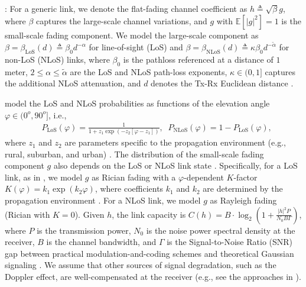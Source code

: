 \documentclass[12pt, draftcls, onecolumn]{IEEEtran}
\theoremstyle{plain}
\theoremstyle{definition}
\theoremstyle{remark}
\begin{document}
: For a generic link, we denote the flat-fading channel coefficient as $h{\triangleq}\sqrt{\beta}g$, where $\beta$ captures the large-scale channel variations, and $g$ with $\mathbb{E}\left[|g|^2\right]{=}1$ is the small-scale fading component. We model the large-scale component as $\beta{=}\beta_{\mathrm{LoS}}(d){\triangleq}\beta_{0}d^{-\alpha}$ for line-of-sight (LoS) and $\beta{=}\beta_{\mathrm{NLoS}}(d){\triangleq}\kappa\beta_{0}d^{-\tilde{\alpha}}$ for non-LoS (NLoS) links, where $\beta_{0}$ is the pathloss referenced at a distance of $1$ meter, $2{\leq}\alpha{\leq}\tilde{\alpha}$ are the LoS and NLoS path-loss exponents, $\kappa{\in}(0,1]$ captures the additional NLoS attenuation, and $d$ denotes the Tx-Rx Euclidean distance \cite{SCA}.

 model the LoS and NLoS probabilities as functions of the elevation angle $\varphi{\in}(0^{o},90^{o}]$, i.e., 
\begin{align}\label{eq:PLoS}
	&P_{\mathrm{LoS}}(\varphi)=\frac{1}{1+z_{1}\exp\left(-z_{2}\left[\varphi-z_{1}\right]\right)},\;\;
	P_{\mathrm{NLoS}}(\varphi)=1-P_{\mathrm{LoS}}(\varphi),
\end{align}
where $z_{1}$ and $z_{2}$ are parameters specific to the propagation environment (e.g., rural, suburban, and urban) \cite{LAP}. The distribution of the small-scale fading component $g$ also depends on the LoS or NLoS link state \cite{WCBook}. Specifically, for a LoS link, as in \cite{Rician}, we model $g$ as Rician fading with a $\varphi$-dependent $K$-factor $K(\varphi){=}k_{1}\exp\left(k_{2}\varphi\right)$, where coefficients $k_{1}$ and $k_{2}$ are determined by the propagation environment \cite{Rician}. For a NLoS link, we model $g$ as Rayleigh fading \cite{WCBook} (Rician with $K{=}0$). Given $h$, the link capacity is $C(h){=}B{\cdot}\log_{2}\left(1{+}\frac{|h|^{2}P}{N_{0}B\Gamma} \right)$, where $P$ is the transmission power, $N_{0}$ is the noise power spectral density at the receiver, $B$ is the channel bandwidth, and $\Gamma$ is the Signal-to-Noise Ratio (SNR) gap between practical modulation-and-coding schemes and theoretical Gaussian signaling \cite{Rician}. We assume that other sources of signal degradation, such as the Doppler effect, are well-compensated at the receiver (e.g., see the approaches in \cite{Doppler}). 
\end{document}
